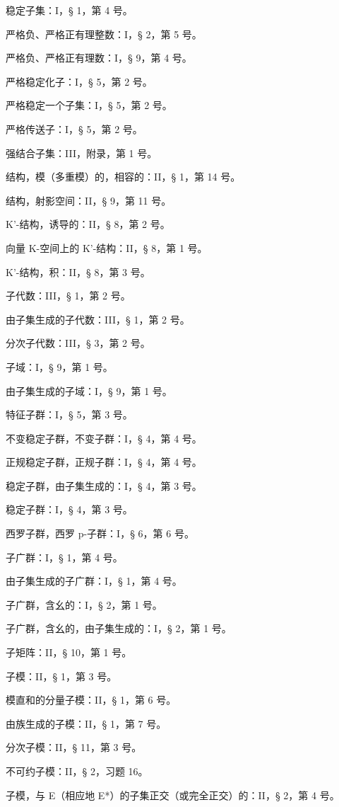 稳定子集：I，§ 1，第 4 号。

严格负、严格正有理整数：I，§ 2，第 5 号。

严格负、严格正有理数：I，§ 9，第 4 号。

严格稳定化子：I，§ 5，第 2 号。

严格稳定一个子集：I，§ 5，第 2 号。

严格传送子：I，§ 5，第 2 号。

强结合子集：III，附录，第 1 号。

结构，模（多重模）的，相容的：II，§ 1，第 14 号。

结构，射影空间：II，§ 9，第 11 号。

K'-结构，诱导的：II，§ 8，第 2 号。

向量 K-空间上的 K'-结构：II，§ 8，第 1 号。

K'-结构，积：II，§ 8，第 3 号。

子代数：III，§ 1，第 2 号。

由子集生成的子代数：III，§ 1，第 2 号。

分次子代数：III，§ 3，第 2 号。

子域：I，§ 9，第 1 号。

由子集生成的子域：I，§ 9，第 1 号。

特征子群：I，§ 5，第 3 号。

不变稳定子群，不变子群：I，§ 4，第 4 号。

正规稳定子群，正规子群：I，§ 4，第 4 号。

稳定子群，由子集生成的：I，§ 4，第 3 号。

稳定子群：I，§ 4，第 3 号。

西罗子群，西罗 p-子群：I，§ 6，第 6 号。

子广群：I，§ 1，第 4 号。

由子集生成的子广群：I，§ 1，第 4 号。

子广群，含幺的：I，§ 2，第 1 号。

子广群，含幺的，由子集生成的：I，§ 2，第 1 号。

子矩阵：II，§ 10，第 1 号。

子模：II，§ 1，第 3 号。

模直和的分量子模：II，§ 1，第 6 号。

由族生成的子模：II，§ 1，第 7 号。

分次子模：II，§ 11，第 3 号。

不可约子模：II，§ 2，习题 16。

子模，与 E（相应地 E*）的子集正交（或完全正交）的：II，§ 2，第 4 号。

